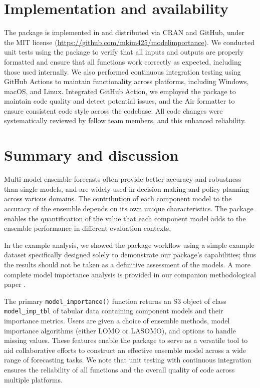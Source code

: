 \documentclass[
  article,
  shortnames,
  notitle]{jss}
\begin{document}
\section{Implementation and
availability}\label{sec:implementation-and-availability}

The  package is implemented in  and
distributed via CRAN and GitHub, under the MIT license
(\url{https://github.com/mkim425/modelimportance}). We conducted unit
tests using the  package \citep{Rpackage-testthat} to
verify that all inputs and outputs are properly formatted and ensure
that all functions work correctly as expected, including those used
internally. We also performed continuous integration testing using
GitHub Actions to maintain functionality across platforms, including
Windows, macOS, and Linux. Integrated GitHub Action, we employed the
 package \citep{Rpackage-lintr} to maintain code quality and
detect potential issues, and the Air formatter \citep{air_formatter} to
ensure consistent code style across the codebase. All code changes were
systematically reviewed by fellow team members, and this enhanced
reliability.

\section{Summary and discussion}\label{sec:discussion}

Multi-model ensemble forecasts often provide better accuracy and
robustness than single models, and are widely used in decision-making
and policy planning across various domains. The contribution of each
component model to the accuracy of the ensemble depends on its own
unique characteristics. The  package enables the
quantification of the value that each component model adds to the
ensemble performance in different evaluation contexts.

In the example analysis, we showed the package workflow using a simple
example dataset specifically designed solely to demonstrate our
package's capabilities; thus the results should not be taken as a
definitive assessment of the models. A more complete model importance
analysis is provided in our companion methodological paper
\citep{kim2026beyond}.

The primary \texttt{model\_importance()} function returns an S3 object
of class \texttt{model\_imp\_tbl} of tabular data containing component
models and their importance metrics. Users are given a choice of
ensemble methods, model importance algorithms (either LOMO or LASOMO),
and options to handle missing values. These features enable the package
to serve as a versatile tool to aid collaborative efforts to construct
an effective ensemble model across a wide range of forecasting tasks. We
note that unit testing with continuous integration ensures the
reliability of all functions and the overall quality of code across
multiple platforms.
\end{document}
